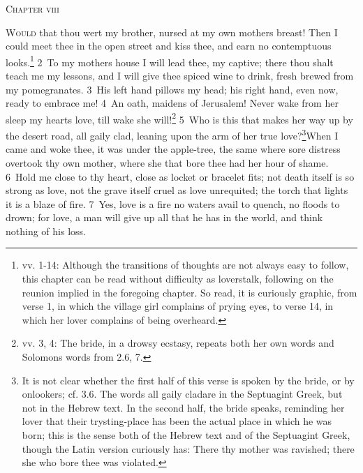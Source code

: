 \documentclass[10pt]{book} %
\begin{document}
\begin{large}\begin{center}\textsc{Chapter viii}\end{center}\end{large}
\lettrine[lines=2]{W}{ould} that thou wert my brother, nursed at my own mother\textquotesingle s breast! Then I could meet thee in the open street and kiss thee, and earn no contemptuous looks.\footnote[1]{vv. 1-14: Although the transitions of thoughts are not always easy to follow, this chapter can be read without difficulty as lovers\textquotesingle  talk, following on the reunion implied in the foregoing chapter. So read, it is curiously graphic, from verse 1, in which the village girl complains of prying eyes, to verse 14, in which her lover complains of being overheard.} \textcolor{benred8}{2}~To my mother\textquotesingle s house I will lead thee, my captive; there thou shalt teach me my lessons, and I will give thee spiced wine to drink, fresh brewed from my pomegranates. \textcolor{benred8}{3}~His left hand pillows my head; his right hand, even now, ready to embrace me! \textcolor{benred8}{4}~An oath, maidens of Jerusalem! Never wake from her sleep my heart\textquotesingle s love, till wake she will!\footnote[2]{vv. 3, 4: The bride, in a drowsy ecstasy, repeats both her own words and Solomon\textquotesingle s words from 2.6, 7.}
\textcolor{benred8}{5}~Who is this that makes her way up by the desert road, all gaily clad, leaning upon the arm of her true love?\footnote[3]{It is not clear whether the first half of this verse is spoken by the bride, or by onlookers; cf. 3.6. The words \textasciigrave all gaily clad\textquotesingle  are in the Septuagint Greek, but not in the Hebrew text. In the second half, the bride speaks, reminding her lover that their trysting-place has been the actual place in which he was born; this is the sense both of the Hebrew text and of the Septuagint Greek, though the Latin version curiously has: \textasciigrave There thy mother was ravished; there she who bore thee was violated\textquotesingle .}When I came and woke thee, it was under the apple-tree, the same where sore distress overtook thy own mother, where she that bore thee had her hour of shame. \textcolor{benred8}{6}~Hold me close to thy heart, close as locket or bracelet fits; not death itself is so strong as love, not the grave itself cruel as love unrequited; the torch that lights it is a blaze of fire. \textcolor{benred8}{7}~Yes, love is a fire no waters avail to quench, no floods to drown; for love, a man will give up all that he has in the world, and think nothing of his loss.
\end{document}

